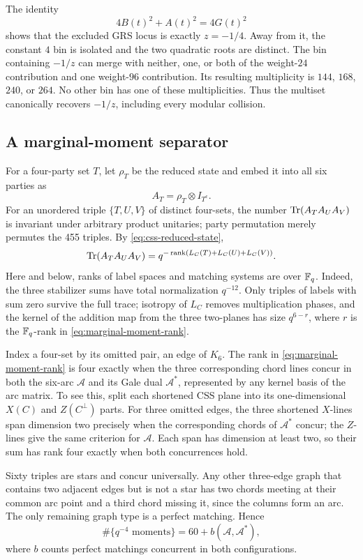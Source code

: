 The identity
\[
 4B(t)^2+A(t)^2=4G(t)^2
\]
shows that the excluded GRS locus is exactly \(z=-1/4\).  Away from it, the
constant \(4\) bin is isolated and the two quadratic roots are distinct.  The
bin containing \(-1/z\) can merge with neither, one, or both of the
weight-\(24\) contribution and one weight-\(96\) contribution.  Its resulting
multiplicity is \(144\), \(168\), \(240\), or \(264\).  No other bin has one
of these multiplicities.  Thus the multiset canonically recovers \(-1/z\),
including every modular collision.

\subsection{A marginal-moment separator}

For a four-party set \(T\), let \(\rho_T\) be the reduced state and embed
it into all six parties as
\[
 A_T=\rho_T\otimes I_{T^c}.
\]
For an unordered triple \(\{T,U,V\}\) of distinct four-sets, the number
\(\operatorname{Tr}(A_TA_UA_V)\) is invariant under arbitrary product unitaries; party
permutation merely permutes the 455 triples.  By
\eqref{eq:css-reduced-state},
\begin{equation}\label{eq:marginal-moment-rank}
 \operatorname{Tr}(A_TA_UA_V)=q^{-\operatorname{rank}(L_C(T)+L_C(U)+L_C(V))}.
\end{equation}
Here and below, ranks of label spaces and matching systems are over
\(\mathbb F_q\).
Indeed, the three stabilizer sums have total normalization \(q^{-12}\).
Only triples of labels with sum zero survive the full trace; isotropy of
\(L_C\) removes multiplication phases, and the kernel of the addition map
from the three two-planes has size \(q^{6-r}\), where \(r\) is the
\(\mathbb F_q\)-rank in \eqref{eq:marginal-moment-rank}.

Index a four-set by its omitted pair, an edge of \(K_6\).  The rank in
\eqref{eq:marginal-moment-rank} is four exactly when the three corresponding chord lines
concur in both the six-arc \(\mathcal A\) and its Gale dual
\(\mathcal A^*\), represented by any kernel basis of the arc matrix.
To see this, split each shortened CSS plane into its one-dimensional
\(X(C)\) and \(Z(C^\perp)\) parts.  For three omitted edges, the three
shortened \(X\)-lines span dimension two precisely when the corresponding
chords of \(\mathcal A^*\) concur; the \(Z\)-lines give the same criterion
for \(\mathcal A\).  Each span has dimension at least two, so their sum
has rank four exactly when both concurrences hold.

Sixty triples are stars and concur universally.  Any other three-edge
graph that contains two adjacent edges but is not a star has two chords
meeting at their common arc point and a third chord missing it, since the
columns form an arc.  The only remaining graph type is a perfect
matching.  Hence
\begin{equation}\label{eq:marginal-moment-count}
\#\{q^{-4}\text{ moments}\}=60+b(\mathcal A,\mathcal A^*),
\end{equation}
where \(b\) counts perfect matchings concurrent in both configurations.

